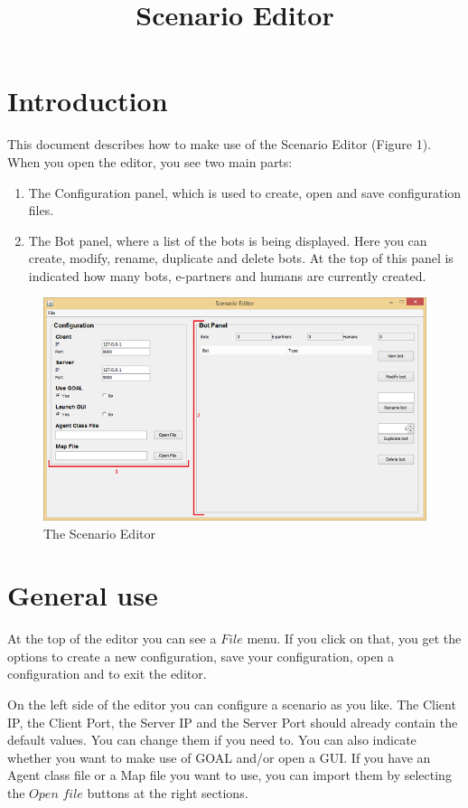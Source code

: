 \documentclass[a4paper]{article}
\title{Scenario Editor}
\date{}
\begin{document}
\maketitle
\newpage

\tableofcontents
\newpage

\section{Introduction}
This document describes how to make use of the Scenario Editor (Figure 1). When you open the editor, you see two main parts:
\begin{enumerate}
\item The Configuration panel, which is used to create, open and save configuration files.
\item The Bot panel, where a list of the bots is being displayed. Here you can create, modify, rename, duplicate and delete bots. At the top of this panel is indicated how many bots, e-partners and humans are currently created.
\end{enumerate}

\begin{figure}
\includegraphics{editor.png}
\caption{The Scenario Editor}
\end{figure}

\section{General use}
At the top of the editor you can see a $File$ menu. If you click on that, you get the options to create a new configuration, save your configuration, open a configuration and to exit the editor.

On the left side of the editor you can configure a scenario as you like. The Client IP, the Client Port, the Server IP and the Server Port should already contain the default values. You can change them if you need to. You can also indicate whether you want to make use of GOAL and/or open a GUI. If you have an Agent class file or a Map file you want to use, you can import them by selecting the $Open$ $file$ buttons at the right sections.
\end{document}
